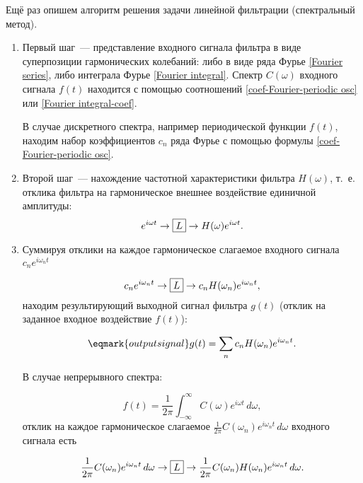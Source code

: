 Ещё раз опишем алгоритм решения задачи линейной фильтрации (спектральный метод).
\begin{enumerate}
    \item Первый шаг~--- представление входного сигнала фильтра в виде
суперпозиции гармонических колебаний: либо в виде ряда Фурье \eqref{Fourier
series}, либо интеграла Фурье \eqref{Fourier integral}. Спектр $C(\omega)$
входного сигнала $f(t)$ находится с помощью соотношений
\eqref{coef-Fourier-periodic osc} или \eqref{Fourier integral-coef}.

В случае дискретного спектра, например периодической функции $f(t)$, находим
набор коэффициентов $c_n$ ряда Фурье с
помощью формулы \eqref{coef-Fourier-periodic osc}.

    \item Второй шаг~--- нахождение частотной характеристики фильтра
$H(\omega)$, т.~е. отклика фильтра на гармоническое
внешнее воздействие единичной амплитуды:
\begin{equation*}
    e^{i\omega t}\to\fbox{$L$}\to H(\omega)e^{i\omega t}.
\end{equation*}

    \item Суммируя отклики на каждое гармоническое слагаемое входного сигнала
$c_n e^{i\omega_n t}$

\begin{equation*}
    c_n e^{i\omega_n t} \to\fbox{$L$}\to c_n H(\omega_n)e^{i\omega_n t},
\end{equation*}
находим результирующий выходной сигнал фильтра $g(t)$ (отклик на заданное
входное воздействие $f(t)$):

\begin{equation}
    \eqmark{output signal}
    g(t)=\sum_n c_n H(\omega_n)e^{i\omega_n t}.
\end{equation}

В случае непрерывного спектра:

\begin{equation*}
    f(t)=\frac{1}{2\pi}\int_{-\infty}^\infty C(\omega)e^{i\omega t}\,d\omega,
\end{equation*}
отклик на каждое гармоническое слагаемое $\frac{1}{2\pi} C(\omega_n)e^{i\omega_n
t}\,d\omega$ входного сигнала есть

\begin{equation*}
    \frac{1}{2\pi}C(\omega_n)e^{i\omega_n t}\,d\omega
\to\fbox{$L$}\to\frac{1}{2\pi}C(\omega_n)H(\omega_n)e^{i\omega_nt}\,d\omega.
\end{equation*}


\end{enumerate}
